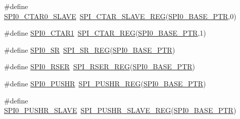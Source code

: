 \begin{DoxyCompactItemize}
\item 
\#define \hyperlink{group___s_p_i___register___accessor___macros_ga4c9d49703b2736f1ed039cd51c0a3286}{S\+P\+I0\+\_\+\+C\+T\+A\+R0\+\_\+\+S\+L\+A\+VE}~\hyperlink{group___s_p_i___register___accessor___macros_ga2025336cecfcf0c5b7cdb30e8056505b}{S\+P\+I\+\_\+\+C\+T\+A\+R\+\_\+\+S\+L\+A\+V\+E\+\_\+\+R\+EG}(\hyperlink{group___s_p_i___peripheral_ga851f64a97b5919c1f99a34db5918b3b4}{S\+P\+I0\+\_\+\+B\+A\+S\+E\+\_\+\+P\+TR},0)
\item 
\#define \hyperlink{group___s_p_i___register___accessor___macros_ga234cd9dd4ba491ddcca9697084262e55}{S\+P\+I0\+\_\+\+C\+T\+A\+R1}~\hyperlink{group___s_p_i___register___accessor___macros_ga5ab762c9000b796d14c1ce822eefc436}{S\+P\+I\+\_\+\+C\+T\+A\+R\+\_\+\+R\+EG}(\hyperlink{group___s_p_i___peripheral_ga851f64a97b5919c1f99a34db5918b3b4}{S\+P\+I0\+\_\+\+B\+A\+S\+E\+\_\+\+P\+TR},1)
\item 
\#define \hyperlink{group___s_p_i___register___accessor___macros_ga2461be1ade1e6f4c9332082078af0447}{S\+P\+I0\+\_\+\+SR}~\hyperlink{group___s_p_i___register___accessor___macros_ga0621f5a9016db52860125b33dd3519a2}{S\+P\+I\+\_\+\+S\+R\+\_\+\+R\+EG}(\hyperlink{group___s_p_i___peripheral_ga851f64a97b5919c1f99a34db5918b3b4}{S\+P\+I0\+\_\+\+B\+A\+S\+E\+\_\+\+P\+TR})
\item 
\#define \hyperlink{group___s_p_i___register___accessor___macros_ga614a52874363ff4724a035362b2ffe1c}{S\+P\+I0\+\_\+\+R\+S\+ER}~\hyperlink{group___s_p_i___register___accessor___macros_ga9f132bbe51ac921e48eb67afd580ed34}{S\+P\+I\+\_\+\+R\+S\+E\+R\+\_\+\+R\+EG}(\hyperlink{group___s_p_i___peripheral_ga851f64a97b5919c1f99a34db5918b3b4}{S\+P\+I0\+\_\+\+B\+A\+S\+E\+\_\+\+P\+TR})
\item 
\#define \hyperlink{group___s_p_i___register___accessor___macros_ga311e180862c59deeee5e84c30db131db}{S\+P\+I0\+\_\+\+P\+U\+S\+HR}~\hyperlink{group___s_p_i___register___accessor___macros_gacca7ae364ed1cf69ce3a13c76691ce63}{S\+P\+I\+\_\+\+P\+U\+S\+H\+R\+\_\+\+R\+EG}(\hyperlink{group___s_p_i___peripheral_ga851f64a97b5919c1f99a34db5918b3b4}{S\+P\+I0\+\_\+\+B\+A\+S\+E\+\_\+\+P\+TR})
\item 
\#define \hyperlink{group___s_p_i___register___accessor___macros_gae6514b6c606e605cdf798079bed11b25}{S\+P\+I0\+\_\+\+P\+U\+S\+H\+R\+\_\+\+S\+L\+A\+VE}~\hyperlink{group___s_p_i___register___accessor___macros_gab2be31eae2e6d72caaac8897ed48099f}{S\+P\+I\+\_\+\+P\+U\+S\+H\+R\+\_\+\+S\+L\+A\+V\+E\+\_\+\+R\+EG}(\hyperlink{group___s_p_i___peripheral_ga851f64a97b5919c1f99a34db5918b3b4}{S\+P\+I0\+\_\+\+B\+A\+S\+E\+\_\+\+P\+TR})

\end{DoxyCompactItemize}
